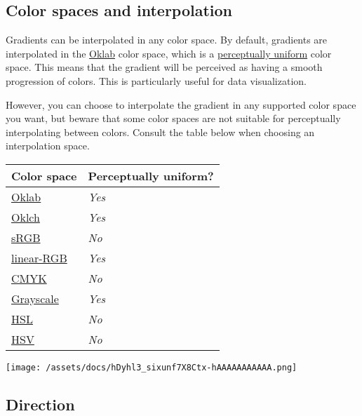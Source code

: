 \subsection{Color spaces and
interpolation}\label{color-spaces-and-interpolation}

Gradients can be interpolated in any color space. By default, gradients
are interpolated in the
\href{/docs/reference/visualize/color/\#definitions-oklab}{Oklab} color
space, which is a
\href{https://programmingdesignsystems.com/color/perceptually-uniform-color-spaces/index.html}{perceptually
uniform} color space. This means that the gradient will be perceived as
having a smooth progression of colors. This is particularly useful for
data visualization.

However, you can choose to interpolate the gradient in any supported
color space you want, but beware that some color spaces are not suitable
for perceptually interpolating between colors. Consult the table below
when choosing an interpolation space.

\begin{longtable}[]{@{}ll@{}}
\toprule\noalign{}
Color space & Perceptually uniform? \\
\midrule\noalign{}
\endhead
\bottomrule\noalign{}
\endlastfoot
\href{/docs/reference/visualize/color/\#definitions-oklab}{Oklab} &
\emph{Yes} \\
\href{/docs/reference/visualize/color/\#definitions-oklch}{Oklch} &
\emph{Yes} \\
\href{/docs/reference/visualize/color/\#definitions-rgb}{sRGB} &
\emph{No} \\
\href{/docs/reference/visualize/color/\#definitions-linear-rgb}{linear-RGB}
& \emph{Yes} \\
\href{/docs/reference/visualize/color/\#definitions-cmyk}{CMYK} &
\emph{No} \\
\href{/docs/reference/visualize/color/\#definitions-luma}{Grayscale} &
\emph{Yes} \\
\href{/docs/reference/visualize/color/\#definitions-hsl}{HSL} &
\emph{No} \\
\href{/docs/reference/visualize/color/\#definitions-hsv}{HSV} &
\emph{No} \\
\end{longtable}

\texttt{[image: /assets/docs/hDyhl3\_sixunf7X8Ctx-hAAAAAAAAAAA.png]}

\subsection{Direction}\label{direction}

